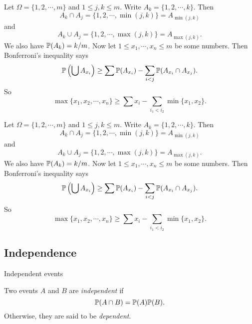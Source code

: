 \begin{note}
  \begin{field}
    \begin{eg}
      Let $\Omega = \{1, 2, \cdots, m\}$ and $1 \leq j, k \leq m$. Write $A_k = \{1, 2, \cdots, k\}$. Then
      \[
        A_k \cap A_j = \{1, 2, \cdots, \min(j, k)\} = A_{\min(j, k)}
      \]
      and
      \[
        A_k \cup A_j = \{1, 2, \cdots, \max(j, k)\} = A_{\max(j, k)}.
      \]
      We also have $\P(A_k) = k/m$.
      Now let $1 \leq x_1, \cdots, x_n \leq m$ be some numbers. Then Bonferroni's inequality says
      \[
        \P\left(\bigcup A_{x_{i}}\right) \geq \sum \P(A_{x_i}) - \sum_{i < j} \P(A_{x_i}\cap A_{x_j}).
      \]
      So
      \[
        \max\{x_1, x_2, \cdots, x_n\} \geq \sum x_i - \sum_{i_1 < i_2} \min\{x_1, x_2\}.
      \]
    \end{eg}
  \end{field}
  \begin{field}
    \begin{eg}
      Let $\Omega = \{1, 2, \cdots, m\}$ and $1 \leq j, k \leq m$. Write $A_k = \{1, 2, \cdots, k\}$. Then
      \[
        A_k \cap A_j = \{1, 2, \cdots, \min(j, k)\} = A_{\min(j, k)}
      \]
      and
      \[
        A_k \cup A_j = \{1, 2, \cdots, \max(j, k)\} = A_{\max(j, k)}.
      \]
      We also have $\P(A_k) = k/m$.
      Now let $1 \leq x_1, \cdots, x_n \leq m$ be some numbers. Then Bonferroni's inequality says
      \[
        \P\left(\bigcup A_{x_{i}}\right) \geq \sum \P(A_{x_i}) - \sum_{i < j} \P(A_{x_i}\cap A_{x_j}).
      \]
      So
      \[
        \max\{x_1, x_2, \cdots, x_n\} \geq \sum x_i - \sum_{i_1 < i_2} \min\{x_1, x_2\}.
      \]
    \end{eg}
  \end{field}
  \xplain{}%
\end{note}

\subsection{Independence}

%
\begin{note}
  \begin{field}
    Independent events
  \end{field}
  \begin{field}
    \begin{defi}
      Two events $A$ and $B$ are \emph{independent} if
      \[
        \P(A\cap B) = \P(A)\P(B).
      \]
      Otherwise, they are said to be \emph{dependent}.
    \end{defi}
  \end{field}
  \xplain{}%
\end{note}

